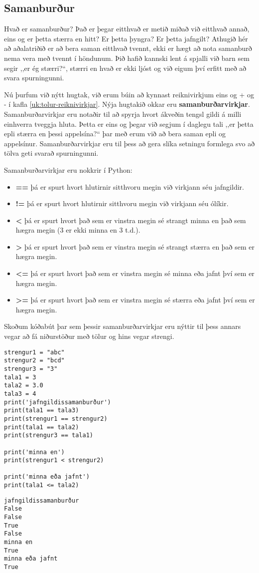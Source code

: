 \subsection{Samanburður}
Hvað er samanburður?
Það er þegar eitthvað er metið miðað við eitthvað annað, eins og er þetta stærra en hitt?
Er þetta þyngra?
Er þetta jafngilt?
Athugið hér að aðalatriðið er að bera saman eitthvað tvennt, ekki er hægt að nota samanburð nema vera með tvennt í höndunum.
Þið hafið kannski lent á spjalli við barn sem segir ,,er ég stærri?“, stærri en hvað er ekki ljóst og við eigum því erfitt með að svara spurningunni.

Nú þurfum við nýtt hugtak, við erum búin að kynnast reiknivirkjum eins og + og - í kafla \ref{uk:tolur-reiknivirkjar}.
Nýja hugtakið okkar eru \textbf{samanburðarvirkjar}.
Samanburðarvirkjar eru notaðir til að spyrja hvort ákveðin tengsl gildi á milli einhverra tveggja hluta.
Þetta er eins og þegar við segjum í daglegu tali ,,er þetta epli stærra en þessi appelsína?“ þar með erum við að bera saman epli og appelsínur.
Samanburðarvirkjar eru til þess að gera slíka setningu formlega svo að tölva geti svarað spurningunni.

Samanburðarvirkjar eru nokkrir í Python:
\begin{itemize}
	\item[] \textbf{==} þá er spurt hvort hlutirnir sitthvoru megin við virkjann séu jafngildir.
	\item[] \textbf{!=} þá er spurt hvort hlutirnir sitthvoru megin við virkjann séu ólíkir.
	\item[] \textbf{<} þá er spurt hvort það sem er vinstra megin sé strangt minna en það sem hægra megin (3 er ekki minna en 3 t.d.).
	\item[] \textbf{>} þá er spurt hvort það sem er vinstra megin sé strangt stærra en það sem er hægra megin.
	\item[] \textbf{<=} þá er spurt hvort það sem er vinstra megin sé minna eða jafnt því sem er hægra megin.
	\item[] \textbf{>=} þá er spurt hvort það sem er vinstra megin sé stærra eða jafnt því sem er hægra megin.
\end{itemize}

Skoðum kóðabút þar sem þessir samanburðarvirkjar eru nýttir til þess annars vegar að fá niðurstöður með tölur og hins vegar strengi.
\begin{lstlisting}[caption=Samanburðarvirkjar, label=lst:bool-samanburður]
strengur1 = "abc"
strengur2 = "bcd"
strengur3 = "3"
tala1 = 3
tala2 = 3.0
tala3 = 4
print('jafngildissamanburður')
print(tala1 == tala3)
print(strengur1 == strengur2)
print(tala1 == tala2)
print(strengur3 == tala1)

print('minna en')
print(strengur1 < strengur2)

print('minna eða jafnt')
print(tala1 <= tala2)
\end{lstlisting}
\lstset{style=uttak}
\begin{lstlisting}
jafngildissamanburður
False
False
True
False
minna en
True
minna eða jafnt
True
\end{lstlisting}
\lstset{style=venjulegt}

